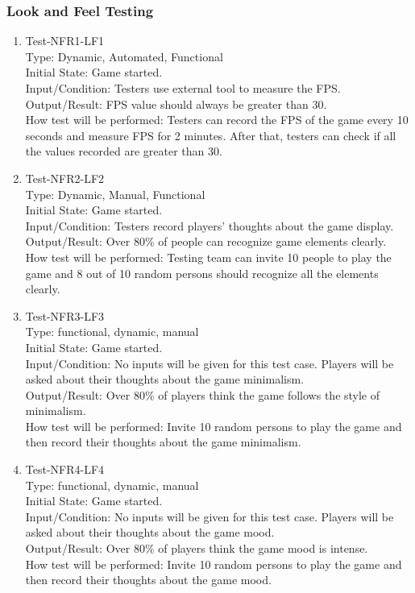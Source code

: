 \documentclass[12pt]{article}
\begin{document}
\subsubsection{Look and Feel Testing}
\begin{enumerate}[1.]
\item Test-NFR1-LF1\\
Type: Dynamic, Automated, Functional\\
Initial State: Game started.\\
Input/Condition: Testers use external tool to measure
 the FPS.\\
Output/Result: FPS value should always be greater than
30.\\
How test will be performed: Testers can record the FPS
of the game every 10 seconds and measure FPS for 2
minutes. After that, testers can check if all the 
values recorded are greater than 30.
\item Test-NFR2-LF2\\
Type: Dynamic, Manual, Functional\\
Initial State: Game started.\\
Input/Condition: Testers record players' thoughts about 
the game display.\\
Output/Result: Over 80\% of people can recognize 
game elements clearly.\\ 
How test will be performed: Testing team
can invite 10 people to play the game and
8 out of 10 random persons should recognize all the elements clearly.
\item Test-NFR3-LF3\\
Type: functional, dynamic, manual\\
Initial State: Game started.\\
Input/Condition: No inputs will be given for this 
test case. Players will be asked about their thoughts
about the game minimalism.\\
Output/Result: Over 80\% of players think the game
follows the style of minimalism.\\
How test will be performed: Invite 10 random persons to
play the game and then record their thoughts about the
game minimalism.
\item Test-NFR4-LF4\\
Type: functional, dynamic, manual\\
Initial State: Game started.\\
Input/Condition: No inputs will be given for this 
test case. Players will be asked about their thoughts
about the game mood.\\
Output/Result: Over 80\% of players think the game
mood is intense.\\
How test will be performed: Invite 10 random persons to
play the game and then record their thoughts about the
game mood.
\end{enumerate}
\newpage
\end{document}
